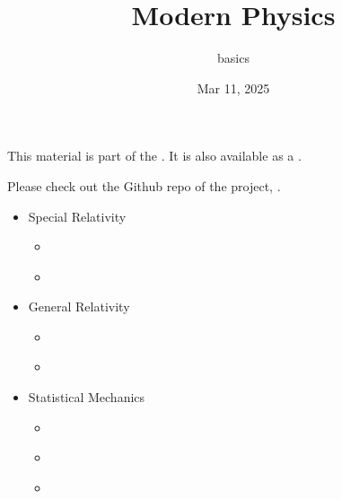 \documentclass[letterpaper,10pt,english]{jupyterBook}
\title{Modern Physics}
\date{Mar 11, 2025}
\author{basics}
\begin{document}
\pagestyle{empty}
\sphinxmaketitle
\pagestyle{plain}
\sphinxtableofcontents
\pagestyle{normal}
\label{\detokenize{intro::doc}}


\sphinxAtStartPar
This material is part of the . It is also available as a .

\sphinxAtStartPar
Please check out the Github repo of the project, .
\begin{itemize}
\item {} 
\sphinxAtStartPar
Special Relativity

\begin{itemize}
\item {} 
\sphinxAtStartPar
{\hyperref[\detokenize{ch/relativity-special/intro::doc}]{}}

\item {} 
\sphinxAtStartPar
{\hyperref[\detokenize{ch/relativity-special/notes::doc}]{}}

\end{itemize}
\end{itemize}
\begin{itemize}
\item {} 
\sphinxAtStartPar
General Relativity

\begin{itemize}
\item {} 
\sphinxAtStartPar
{\hyperref[\detokenize{ch/relativity-general/intro::doc}]{}}

\item {} 
\sphinxAtStartPar
{\hyperref[\detokenize{ch/relativity-general/notes::doc}]{}}

\end{itemize}
\end{itemize}
\begin{itemize}
\item {} 
\sphinxAtStartPar
Statistical Mechanics

\begin{itemize}
\item {} 
\sphinxAtStartPar
{\hyperref[\detokenize{ch/statistical-mechanics/intro::doc}]{}}

\item {} 
\sphinxAtStartPar
{\hyperref[\detokenize{ch/statistical-mechanics/notes::doc}]{}}

\item {} 
\sphinxAtStartPar
{\hyperref[\detokenize{ch/statistical-mechanics/statistics::doc}]{}}

\end{itemize}
\end{itemize}
\end{document}
